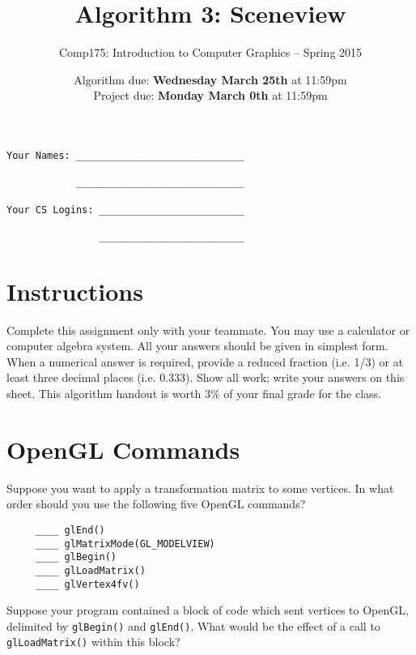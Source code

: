 \documentclass[10pt,twocolumn]{article}
\title{\Huge{\bf Algorithm 3: Sceneview}}
\author{Comp175: Introduction to Computer Graphics -- Spring 2015}
\date{Algorithm due:  {\bf Wednesday March 25th} at 11:59pm\\
Project due:  {\bf Monday March 0th} at 11:59pm}
\begin{document}
\maketitle

\begin{verbatim}
Your Names: _____________________________

            _____________________________

Your CS Logins: _________________________

                _________________________
\end{verbatim}


\section{Instructions}
Complete this assignment only with your teammate. You may use a
calculator or computer algebra system. All your answers should be given in simplest form.
When a numerical answer is required, provide a reduced fraction (i.e. 1/3) or at least three
decimal places (i.e. 0.333). Show all work; write your answers on this sheet. This algorithm handout is worth 3\% of your final grade for the class.

\section{OpenGL Commands}
\begin{framed}
 Suppose you want to apply a transformation matrix to some vertices. In what order should you use the following five OpenGL commands?
\begin{verbatim}
     ____ glEnd()
     ____ glMatrixMode(GL_MODELVIEW)
     ____ glBegin()
     ____ glLoadMatrix()
     ____ glVertex4fv()
\end{verbatim}
\end{framed}


\begin{framed}
 Suppose your program contained a block of code which sent vertices to OpenGL, delimited by {\tt glBegin()} and {\tt glEnd()}. What would be the effect of a call to {\tt glLoadMatrix()} within this block?
\vspace{10em}
\end{framed}
\end{document}
